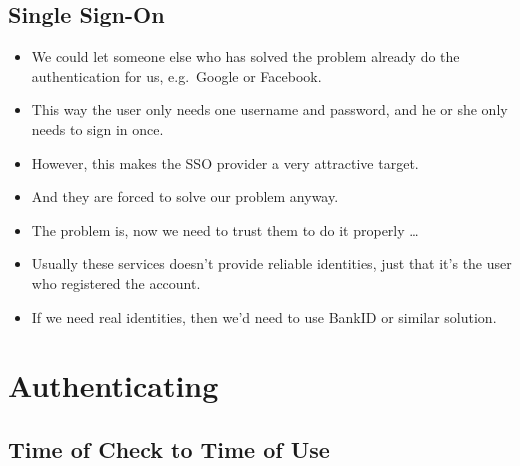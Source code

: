 \documentclass{beamer}
\begin{document}
\subsection{Single Sign-On}

\begin{frame}{\insertsubsectionhead}
  \begin{itemize}
    \item We could let someone else who has solved the problem already do the 
      authentication for us, e.g.\ Google or Facebook.

    \item This way the user only needs one username and password, and he or she 
      only needs to sign in once.

    \item However, this makes the SSO provider a very attractive target.

    \item And they are forced to solve our problem anyway.

    \item The problem is, now we need to trust them to do it properly \dots
  \end{itemize}
\end{frame}

\begin{frame}{\insertsubsectionhead}
  \begin{itemize}
    \item Usually these services doesn't provide reliable identities, just that 
      it's the user who registered the account.

    \item If we need real identities, then we'd need to use BankID or similar 
      solution.
  \end{itemize}
\end{frame}


\section{Authenticating}

\subsection{Time of Check to Time of Use}
\end{document}
